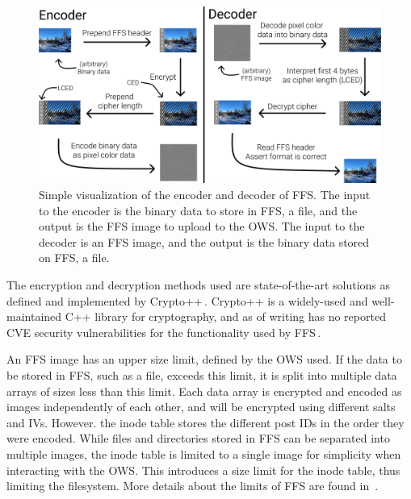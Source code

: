 \begin{figure}[!ht]
	\begin{center}
	  \includegraphics[width=1.0\textwidth]{figures.nosync/encoder_decoder.png}
	\end{center}
	\caption[Simple visualization of the encoder and decoder of \gls{FFS}]{Simple visualization of the encoder and decoder of \gls{FFS}. The input to the encoder is the binary data to store in \gls{FFS}, \eg a file, and the output is the \gls{FFS} image to upload to the \gls{OWS}. The input to the decoder is an \gls{FFS} image, and the output is the binary data stored on \gls{FFS}, \eg a file.}
	\label{fig:file_enc_dec}
\end{figure}

The encryption and decryption methods used are \mbox{state-of-the-art} solutions as defined and implemented by Crypto++\,\cite{CryptoLibraryFree}. Crypto++ is a \mbox{widely-used} and \mbox{well-maintained} C++ library for cryptography, and as of writing has no reported CVE security vulnerabilities for the functionality used by \gls{FFS}\,\cite{CryptoppSecurityVulnerabilities}.

An \gls{FFS} image has an upper size limit, defined by the \gls{OWS} used. If the data to be stored in \gls{FFS}, such as a file, exceeds this limit, it is split into multiple data arrays of sizes less than this limit. Each data array is encrypted and encoded as images independently of each other, and will be encrypted using different salts and \gls{IV}s. However. the inode table stores the different post IDs in the order they were encoded. While files and directories stored in \gls{FFS} can be separated into multiple images, the inode table is limited to a single image for simplicity when interacting with the \gls{OWS}. This introduces a size limit for the inode table, thus limiting the filesystem. More details about the limits of \gls{FFS} are found in~.

